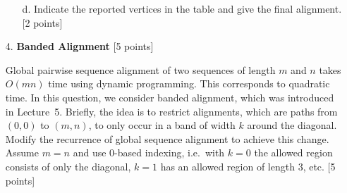 \begin{enumerate}
\begin{enumerate}
\clearpage
\item[d.] Indicate the reported vertices in the table and give the final alignment. [2 points]
\\[.5em]

\end{enumerate}

\clearpage

\item[4.] \textbf{Banded Alignment} [5 points]

Global pairwise sequence alignment of two sequences of length $m$ and $n$ takes $O(mn)$ time using dynamic programming.
This corresponds to quadratic time.
In this question, we consider banded alignment, which was introduced in Lecture~5. Briefly, the idea is to restrict alignments, which are paths from $(0,0)$ to $(m,n)$, to only occur in a band of width $k$ around the diagonal. Modify the recurrence of global sequence alignment to achieve this change. Assume $m=n$ and use 0-based indexing, i.e.\ with $k=0$ the allowed region consists of only the diagonal, $k=1$ has an allowed region of length $3$, etc. [5 points]
\\[.5em]
\end{enumerate}
